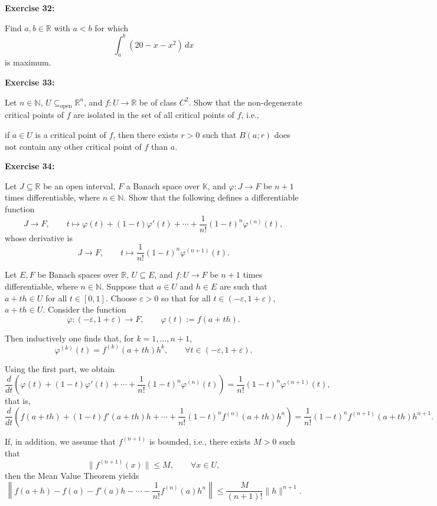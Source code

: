 \documentclass{book}
\begin{document}
\bigskip

\textbf{Exercise 32:}

Find $a,b \in \mathbb{R}$ with $a<b$ for which
\[
\int_a^b (20 - x - x^2)\,dx
\]
is maximum.

\bigskip

\textbf{Exercise 33:}

Let $n \in \mathbb{N}$, $U \subseteq_{\mathrm{open}} \mathbb{R}^n$,
and $f : U \to \mathbb{R}$ be of class $C^2$.
Show that the non-degenerate critical points of $f$ are isolated
in the set of all critical points of $f$, i.e.,

if $a \in U$ is a critical point of $f$, then there exists $r>0$
such that $B(a;r)$ does not contain any other critical point of $f$
than $a$.

\textbf{Exercise 34:}

Let $J \subseteq \mathbb{R}$ be an open interval, $F$ a Banach space over $\mathbb{K}$,
and $\varphi : J \to F$ be $n+1$ times differentiable, where $n \in \mathbb{N}$.
Show that the following defines a differentiable function
\[
J \longrightarrow F,
\qquad
t \longmapsto
\varphi(t)
+ (1-t)\varphi'(t)
+ \cdots
+ \frac{1}{n!}(1-t)^n \varphi^{(n)}(t),
\]
whose derivative is
\[
J \longrightarrow F,
\qquad
t \longmapsto
\frac{1}{n!}(1-t)^n \varphi^{(n+1)}(t).
\]

\bigskip

Let $E,F$ be Banach spaces over $\mathbb{R}$, $U \subseteq E$, and
$f : U \to F$ be $n+1$ times differentiable, where $n \in \mathbb{N}$.
Suppose that $a \in U$ and $h \in E$ are such that $a+th \in U$
for all $t \in [0,1]$.
Choose $\varepsilon>0$ so that for all $t \in (-\varepsilon,1+\varepsilon)$,
$a+th \in U$.
Consider the function
\[
\varphi : (-\varepsilon,1+\varepsilon) \longrightarrow F,
\qquad
\varphi(t) := f(a+th).
\]

Then inductively one finds that, for $k=1,\dots,n+1$,
\[
\varphi^{(k)}(t)
=
f^{(k)}(a+th)h^k,
\qquad
\forall t \in (-\varepsilon,1+\varepsilon).
\]

Using the first part, we obtain
\[
\frac{d}{dt}
\left(
\varphi(t)
+ (1-t)\varphi'(t)
+ \cdots
+ \frac{1}{n!}(1-t)^n \varphi^{(n)}(t)
\right)
=
\frac{1}{n!}(1-t)^n \varphi^{(n+1)}(t),
\]
that is,
\[
\frac{d}{dt}
\left(
f(a+th)
+ (1-t)f'(a+th)h
+ \cdots
+ \frac{1}{n!}(1-t)^n f^{(n)}(a+th)h^n
\right)
=
\frac{1}{n!}(1-t)^n f^{(n+1)}(a+th)h^{n+1}.
\]

\bigskip

If, in addition, we assume that $f^{(n+1)}$ is bounded, i.e.,
there exists $M>0$ such that
\[
\|f^{(n+1)}(x)\| \le M,
\qquad
\forall x \in U,
\]
then the Mean Value Theorem yields
\[
\left\|
f(a+h)
- f(a)
- f'(a)h
- \cdots
- \frac{1}{n!}f^{(n)}(a)h^n
\right\|
\le
\frac{M}{(n+1)!}\|h\|^{n+1}.
\tag{27}
\]
\end{document}
